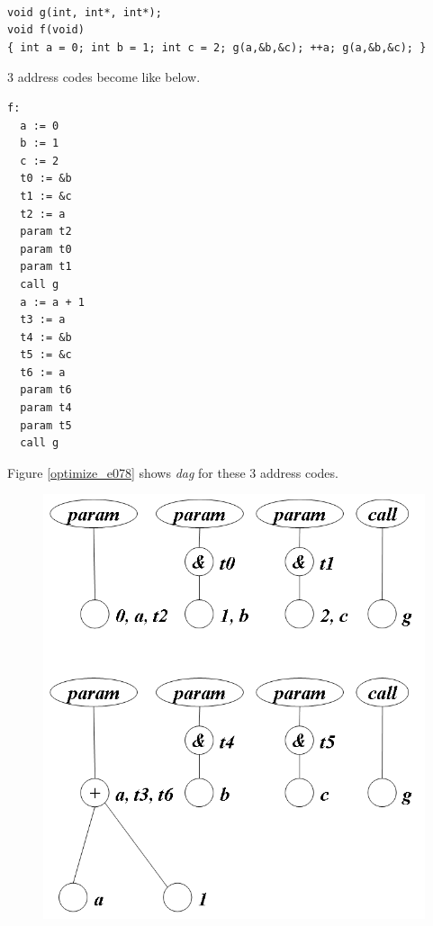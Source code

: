 \begin{Example}
\label{optimize_e077}
\begin{verbatim}

void g(int, int*, int*);
void f(void)
{ int a = 0; int b = 1; int c = 2; g(a,&b,&c); ++a; g(a,&b,&c); }
\end{verbatim}
3 address codes become like below.
\begin{verbatim}
f:
  a := 0
  b := 1
  c := 2
  t0 := &b
  t1 := &c
  t2 := a
  param t2
  param t0
  param t1
  call g
  a := a + 1
  t3 := a
  t4 := &b
  t5 := &c
  t6 := a
  param t6
  param t4
  param t5
  call g
\end{verbatim}
Figure \ref{optimize_e078} shows {\em dag} for these 3 address codes.
\begin{figure}[htbp]
\begin{center}
\begin{htmlonly}
\includegraphics[width=1.0\linewidth,height=0.894\linewidth]{opt032.png}
\end{htmlonly}
\begin{latexonly}

\end{latexonly}
\end{center}
\end{figure}
\end{Example}

